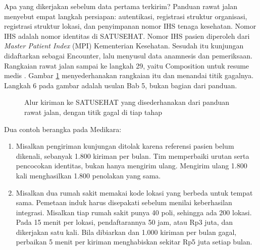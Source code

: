 Apa yang dikerjakan sebelum data pertama terkirim? Panduan rawat jalan menyebut empat langkah persiapan: autentikasi,
registrasi struktur organisasi, registrasi struktur lokasi, dan penyimpanan nomor IHS tenaga kesehatan. Nomor IHS
adalah nomor identitas di SATUSEHAT. Nomor IHS pasien diperoleh dari \textit{Master Patient Index} (MPI) Kementerian
Kesehatan. Sesudah itu kunjungan didaftarkan sebagai Encounter, lalu menyusul data anamnesis dan pemeriksaan.
Rangkaian rawat jalan sampai ke langkah 29, yaitu Composition untuk resume medis \cite{c07-satusehat-rajal}. Gambar
\ref{fig:ch07-alur} menyederhanakan rangkaian itu dan menandai titik gagalnya. Langkah 6 pada gambar adalah usulan Bab
5, bukan bagian dari panduan.

\begin{figure}[!htb]
  \centering
  
  \caption{Alur kiriman ke SATUSEHAT yang disederhanakan dari panduan rawat jalan, dengan titik gagal di tiap tahap}
  \label{fig:ch07-alur}
\end{figure}

Dua contoh berangka pada Medikara:
\begin{enumerate}
  \item Misalkan pengiriman kunjungan ditolak karena referensi pasien belum dikenali, sebanyak 1.800 kiriman per
        bulan. Tim memperbaiki urutan serta pencocokan identitas, bukan hanya mengirim ulang. Mengirim ulang 1.800
        kali menghasilkan 1.800 penolakan yang sama.
  \item Misalkan dua rumah sakit memakai kode lokasi yang berbeda untuk tempat sama. Pemetaan induk harus disepakati
        sebelum menilai keberhasilan integrasi. Misalkan tiap rumah sakit punya 40 poli, sehingga ada 200 lokasi. Pada
        15 menit per lokasi, pendaftarannya 50 jam, atau Rp3 juta, dan dikerjakan satu kali. Bila dibiarkan dan 1.000
        kiriman per bulan gagal, perbaikan 5 menit per kiriman menghabiskan sekitar Rp5 juta setiap bulan.
\end{enumerate}


